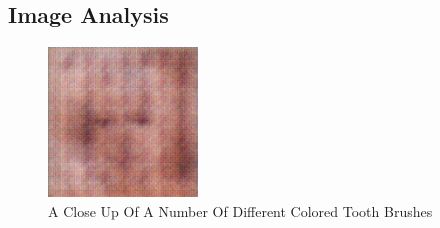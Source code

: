\documentclass{article}%
\begin{document}
%
\subsection{Image Analysis}%
\label{subsec:ImageAnalysis}%


\begin{figure}[h!]%
\centering%
\includegraphics[width=150px]{500_fake_images/samples_5_498.png}%
\caption{A Close Up Of A Number Of Different Colored Tooth Brushes}%
\end{figure}

%
\end{document}
